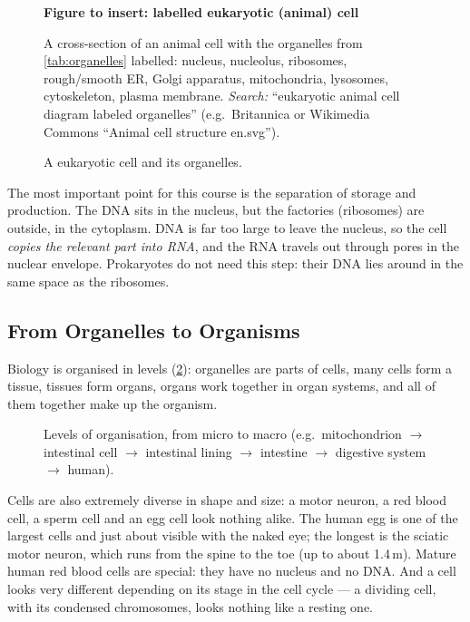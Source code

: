 \documentclass[11pt, oneside]{book}
\newcommand{\figureplaceholder}[5]{%
\begin{figure}[htbp]
\centering
\begin{tcolorbox}[unbreakable,width=\linewidth,height=#1,colback=accent!3,
  colframe=accent!30,boxrule=0.5pt,arc=2.5mm,sharp corners=all,
  valign=center,halign=center,fontupper=\small]
{\bfseries\color{accent}Figure to insert: #2}\par\medskip
{\color{gray!75!black}#3}
\end{tcolorbox}
\caption{#4}\label{#5}
\end{figure}}
\let\originalsubsection\subsection
\renewcommand{\subsection}{\Needspace{6\baselineskip}\originalsubsection}
\begin{document}
\figureplaceholder{5.5cm}{labelled eukaryotic (animal) cell}%
{A cross-section of an animal cell with the organelles from
\cref{tab:organelles} labelled: nucleus, nucleolus, ribosomes, rough/smooth
ER, Golgi apparatus, mitochondria, lysosomes, cytoskeleton, plasma membrane.
\textit{Search:} ``eukaryotic animal cell diagram labeled organelles''
(e.g.\ Britannica or Wikimedia Commons ``Animal cell structure en.svg'').}%
{A eukaryotic cell and its organelles.}{fig:cell}

The most important point for this course is the separation of storage and
production. The DNA sits in the nucleus, but the factories (ribosomes) are
outside, in the cytoplasm. DNA is far too large to leave the nucleus, so the
cell \emph{copies the relevant part into RNA}, and the RNA travels out
through pores in the nuclear envelope. Prokaryotes do not need this step:
their DNA lies around in the same space as the ribosomes.

\subsection{From Organelles to Organisms}

Biology is organised in levels (\cref{fig:hierarchy}): organelles are parts
of cells, many cells form a tissue, tissues form organs, organs work together
in organ systems, and all of them together make up the organism.

\begin{figure}[htbp]
\centering
{}
\caption{Levels of organisation, from micro to macro (e.g.\ mitochondrion
$\to$ intestinal cell $\to$ intestinal lining $\to$ intestine $\to$ digestive
system $\to$ human).}
\label{fig:hierarchy}
\end{figure}

Cells are also extremely diverse in shape and size: a motor neuron, a red
blood cell, a sperm cell and an egg cell look nothing alike. The human egg is
one of the largest cells and just about visible with the naked eye; the
longest is the sciatic motor neuron, which runs from the spine to the toe
(up to about 1.4\,m). Mature human red blood cells are special: they have no
nucleus and no DNA. And a cell looks very different depending on its stage
in the cell cycle --- a dividing cell, with its condensed chromosomes, looks
nothing like a resting one.
\end{document}

